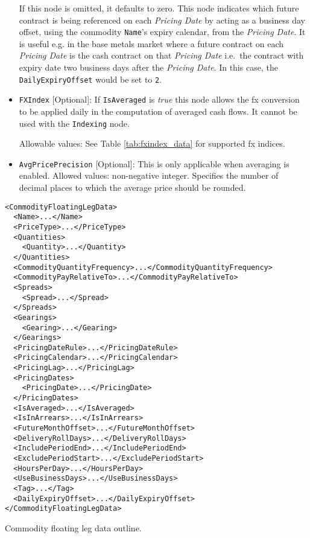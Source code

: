 \begin{itemize}
If this node is omitted, it defaults to zero. This node indicates which future contract is being referenced on each
\textit{Pricing Date} by acting as a business day offset, using the commodity \lstinline!Name!'s expiry calendar, from
the \textit{Pricing Date}. It is useful e.g. in the base metals market where a future contract on each \textit{Pricing
  Date} is the cash contract on that \textit{Pricing Date} i.e.\ the contract with expiry date two business days after
the \textit{Pricing Date}. In this case, the \lstinline!DailyExpiryOffset! would be set to \lstinline!2!.

\item \lstinline!FXIndex! [Optional]: If \lstinline!IsAveraged! is \emph{true} this node allows the fx conversion to be applied daily in the computation of averaged cash flows. It cannot be used with the \lstinline!Indexing! node.

Allowable values:  See Table \ref{tab:fxindex_data} for supported fx indices.

\item \lstinline|AvgPricePrecision| [Optional]: This is only applicable when averaging is enabled. Allowed values: non-negative integer. Specifies the number of decimal places to which the average price should be rounded.

\end{itemize}

\begin{listing}[h!]
\begin{verbatim}
<CommodityFloatingLegData>
  <Name>...</Name>
  <PriceType>...</PriceType>
  <Quantities>
    <Quantity>...</Quantity>
  </Quantities>
  <CommodityQuantityFrequency>...</CommodityQuantityFrequency>
  <CommodityPayRelativeTo>...</CommodityPayRelativeTo>
  <Spreads>
    <Spread>...</Spread>
  </Spreads>
  <Gearings>
    <Gearing>...</Gearing>
  </Gearings>
  <PricingDateRule>...</PricingDateRule>
  <PricingCalendar>...</PricingCalendar>
  <PricingLag>...</PricingLag>
  <PricingDates>
    <PricingDate>...</PricingDate>
  </PricingDates>
  <IsAveraged>...</IsAveraged>
  <IsInArrears>...</IsInArrears>
  <FutureMonthOffset>...</FutureMonthOffset>
  <DeliveryRollDays>...</DeliveryRollDays>
  <IncludePeriodEnd>...</IncludePeriodEnd>
  <ExcludePeriodStart>...</ExcludePeriodStart>
  <HoursPerDay>...</HoursPerDay>
  <UseBusinessDays>...</UseBusinessDays>
  <Tag>...</Tag>
  <DailyExpiryOffset>...</DailyExpiryOffset>
</CommodityFloatingLegData>
\end{verbatim}
\caption{Commodity floating leg data outline.}
\label{lst:commodity_floating_leg_data}
\end{listing}

